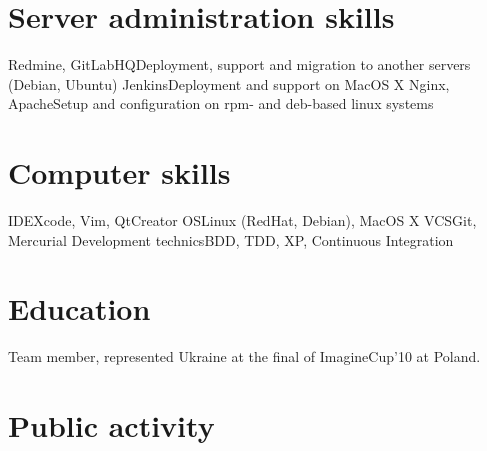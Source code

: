 \documentclass[11pt,a4paper]{moderncv}
\begin{document}
\section{Server administration skills}
\cvline
  {Redmine, GitLabHQ}{Deployment, support and migration to another servers (Debian, Ubuntu)}
\cvline
  {Jenkins}{Deployment and support on MacOS X}
\cvline
  {Nginx, Apache}{Setup and configuration on rpm- and deb-based linux systems}

\section{Computer skills}
  \cvline
  {IDE}{Xcode, Vim, QtCreator}
  \cvline
  {OS}{Linux (RedHat, Debian), MacOS X}
  \cvline
  {VCS}{Git, Mercurial}
  \cvline
  {Development technics}{BDD, TDD, XP, Continuous Integration}

\section{Education}
  {Team member, represented Ukraine at the final of ImagineCup'10 at Poland.}

\section{Public activity}
\end{document}
